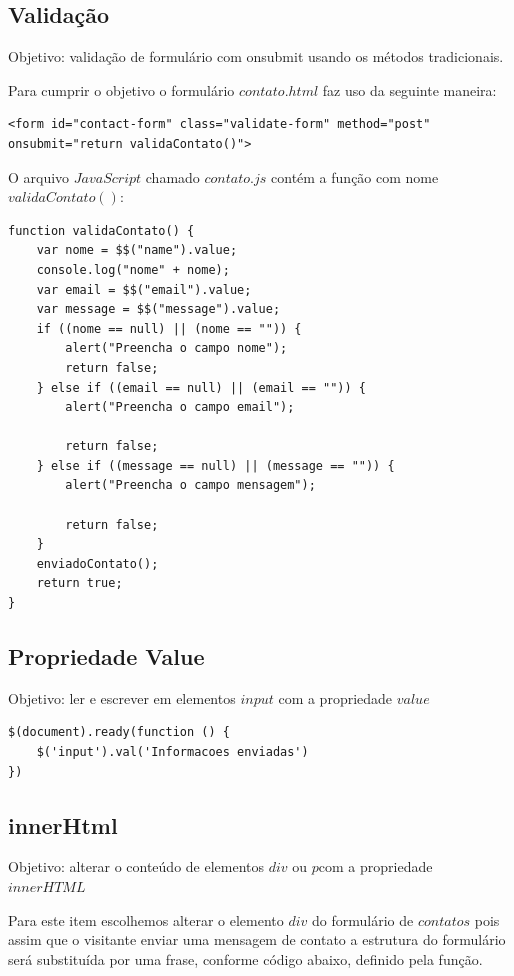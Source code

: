 \subsection{Validação}
	Objetivo: validação de formulário com onsubmit usando os métodos tradicionais.
	
	Para cumprir o objetivo o formulário $contato.html$ faz uso da seguinte maneira:
\begin{lstlisting}
<form id="contact-form" class="validate-form" method="post" onsubmit="return validaContato()">
\end{lstlisting}

	O arquivo $JavaScript$ chamado $contato.js$ contém a função com nome $validaContato()$:
\begin{lstlisting}
function validaContato() {
    var nome = $$("name").value;
    console.log("nome" + nome);
    var email = $$("email").value;
    var message = $$("message").value;
    if ((nome == null) || (nome == "")) {
        alert("Preencha o campo nome");
        return false;
    } else if ((email == null) || (email == "")) {
        alert("Preencha o campo email");

        return false;
    } else if ((message == null) || (message == "")) {
        alert("Preencha o campo mensagem");

        return false;
    }
    enviadoContato();
    return true;
}
\end{lstlisting}
	

\subsection{Propriedade Value}
	Objetivo: ler e escrever em elementos $input$ com a propriedade $value$
	
\begin{lstlisting}
$(document).ready(function () {
    $('input').val('Informacoes enviadas')
})
\end{lstlisting}


\subsection{innerHtml}
	Objetivo: alterar o conteúdo de elementos $div$ ou $p$com a propriedade $innerHTML$
	
	Para este item escolhemos alterar o elemento $div$ do formulário de $contatos$ pois assim que o visitante enviar uma mensagem de contato a estrutura do formulário será substituída por uma frase, conforme código abaixo, definido pela função.


